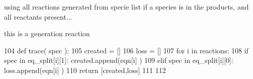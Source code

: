 using all reactions generated from specie list if a species is in the products, and all reactants present... 

this is a generation reaction 
\begin{DoxyCode}
104 \textcolor{keyword}{def }trace( spec ):
105     created = []
106     loss = []
107     \textcolor{keywordflow}{for} i \textcolor{keywordflow}{in} reactions: 
108         \textcolor{keywordflow}{if}  spec \textcolor{keywordflow}{in} eq\_split[i][1]: created.append(eqn[i] )
109         \textcolor{keywordflow}{elif} spec \textcolor{keywordflow}{in} eq\_split[i][0]:   loss.append(eqn[i] )
110     \textcolor{keywordflow}{return} [created,loss]
111 
112  
\end{DoxyCode}
